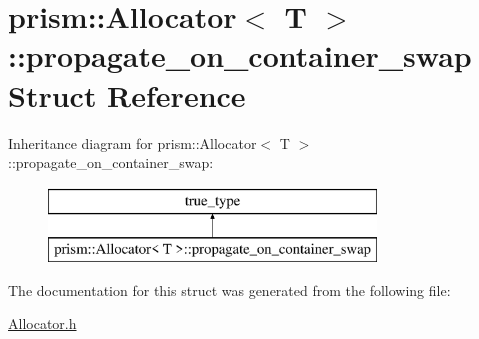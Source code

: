 \hypertarget{structprism_1_1_allocator_1_1propagate__on__container__swap}{}\section{prism\+:\+:Allocator$<$ T $>$\+:\+:propagate\+\_\+on\+\_\+container\+\_\+swap Struct Reference}
\label{structprism_1_1_allocator_1_1propagate__on__container__swap}
Inheritance diagram for prism\+:\+:Allocator$<$ T $>$\+:\+:propagate\+\_\+on\+\_\+container\+\_\+swap\+:\begin{figure}[H]
\begin{center}
\leavevmode
\includegraphics[height=2.000000cm]{structprism_1_1_allocator_1_1propagate__on__container__swap}
\end{center}
\end{figure}


The documentation for this struct was generated from the following file\+:\begin{DoxyCompactItemize}
\item 
\hyperlink{_allocator_8h}{Allocator.\+h}\end{DoxyCompactItemize}
